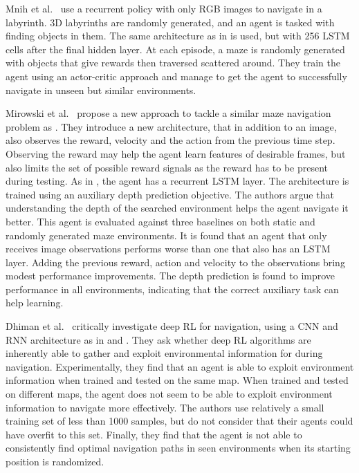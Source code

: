 Mnih et al.~\cite{mnih_asynchronous_2016} use a recurrent policy with only RGB images to navigate in a labyrinth.
3D labyrinths are randomly generated, and an agent is tasked with finding objects in them.
The same architecture as in \cite{mnih_human-level_2015} is used, but with 256 LSTM cells after the final hidden layer.
At each episode, a maze is randomly generated with objects that give rewards then traversed scattered around.
They train the agent using an actor-critic approach and manage to get the agent to successfully navigate in unseen but similar environments.

Mirowski et al.~\cite{mirowski_learning_2017} propose a new approach to tackle a similar maze navigation problem as \cite{mnih_asynchronous_2016}.
They introduce a new architecture, that in addition to an image, also observes the reward, velocity and the action from the previous time step.
Observing the reward may help the agent learn features of desirable frames, but also limits the set of possible reward signals as the reward has to be present during testing.
As in \cite{mnih_asynchronous_2016}, the agent has a recurrent LSTM layer. 
The architecture is trained using an auxiliary depth prediction objective.
The authors argue that understanding the depth of the searched environment helps the agent navigate it better.
This agent is evaluated against three baselines on both static and randomly generated maze environments.
It is found that an agent that only receives image observations performs worse than one that also has an LSTM layer.
Adding the previous reward, action and velocity to the observations bring modest performance improvements.
The depth prediction is found to improve performance in all environments, indicating that the correct auxiliary task can help learning.

Dhiman et al.~\cite{dhiman_critical_2019} critically investigate deep RL for navigation, using a CNN and RNN architecture as in \cite{hausknecht_deep_2017} and \cite{mirowski_learning_2017}.
They ask whether deep RL algorithms are inherently able to gather and exploit environmental information for during navigation.
Experimentally, they find that an agent is able to exploit environment information when trained and tested on the same map.
When trained and tested on different maps, the agent does not seem to be able to exploit environment information to navigate more effectively.
The authors use relatively a small training set of less than 1000 samples, but do not consider that their agents could have overfit to this set.
Finally, they find that the agent is not able to consistently find optimal navigation paths in seen environments when its starting position is randomized.

